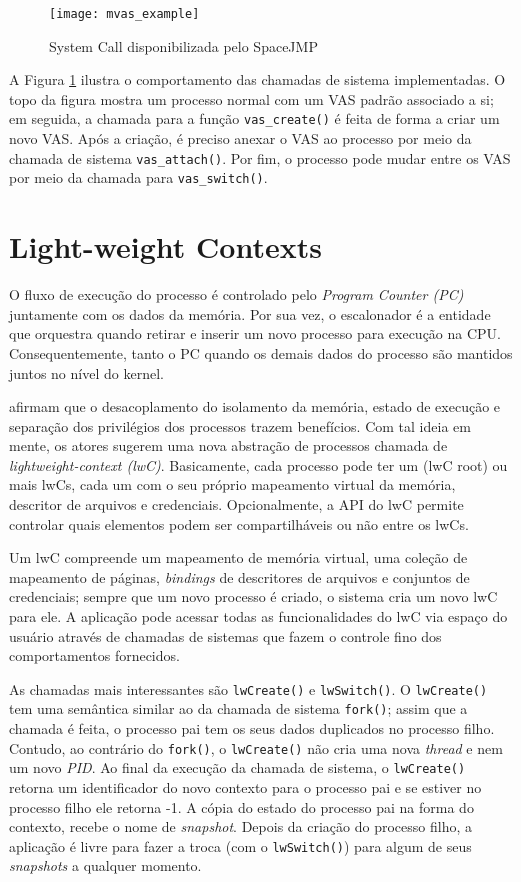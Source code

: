 \begin{figure}[!h]
  \centering
  \texttt{[image: mvas\_example]} 
	\caption[System Call disponibilizada pelo SpaceJMP]{System Call disponibilizada pelo SpaceJMP \cite{ellarge}}
  \label{fig:mvas_example}
\end{figure}

A Figura \ref{fig:mvas_example} ilustra o comportamento das chamadas de sistema
implementadas. O topo da figura mostra um processo normal com um VAS padrão
associado a si; em seguida, a chamada para a função \texttt{vas\_create()} é
feita de forma a criar um novo VAS. Após a criação, é preciso anexar o VAS ao
processo por meio da chamada de sistema \texttt{vas\_attach()}. Por fim, o
processo pode mudar entre os VAS por meio da chamada para
\texttt{vas\_switch()}.

\section{Light-weight Contexts}
\label{sec:lwc}

O fluxo de execução do processo é controlado pelo \textit{Program Counter (PC)}
juntamente com os dados da memória. Por sua vez, o escalonador é a entidade que
orquestra quando retirar e inserir um novo processo para execução na CPU. Consequentemente,
tanto o PC quando os demais dados do processo são mantidos juntos no nível do
kernel.

\citet{litton} afirmam que o desacoplamento do isolamento da memória, estado de
execução e separação dos privilégios dos processos trazem benefícios. Com tal
ideia em mente, os atores sugerem uma nova abstração de processos chamada de
\textit{lightweight-context (lwC)}. Basicamente, cada processo pode ter um
(lwC root) ou mais lwCs, cada um com o seu próprio mapeamento
virtual da memória, descritor de arquivos e credenciais. Opcionalmente, a API
do lwC permite controlar quais elementos podem ser compartilháveis ou não entre
os lwCs.

Um lwC compreende um mapeamento de memória virtual, uma coleção de mapeamento
de páginas, \emph{bindings} de descritores de arquivos e conjuntos de
credenciais; sempre que um novo processo é criado, o sistema cria um novo lwC
para ele. A aplicação pode acessar todas as funcionalidades do lwC via espaço
do usuário através de chamadas de sistemas que fazem o controle fino dos
comportamentos fornecidos.

As chamadas mais interessantes são \texttt{lwCreate()} e \texttt{lwSwitch()}.
O \texttt{lwCreate()} tem uma semântica similar ao da chamada de sistema
\texttt{fork()}; assim que a chamada é feita, o processo pai tem os seus dados
duplicados no processo filho. Contudo, ao contrário do \texttt{fork()}, o
\texttt{lwCreate()} não cria uma nova \emph{thread} e nem um novo \emph{PID}.
Ao final da execução da chamada de sistema, o \texttt{lwCreate()} retorna um
identificador do novo contexto para o processo pai e se estiver no processo
filho ele retorna -1. A cópia do estado do processo pai na forma do contexto,
recebe o nome de \emph{snapshot}. Depois da criação do processo filho, a
aplicação é livre para fazer a troca (com o \texttt{lwSwitch()}) para algum de
seus \emph{snapshots} a qualquer momento.

